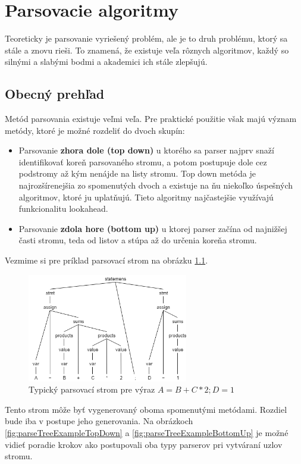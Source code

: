 \chapter{Parsovacie algoritmy}
Teoreticky je parsovanie vyriešený problém, ale je to druh problému, ktorý sa stále a znovu rieši. To znamená, že existuje veľa rôznych algoritmov, každý so silnými a slabými bodmi a akademici ich stále zlepšujú.\cite{tomassetti:parsing}

\section{Obecný prehľad}\label{parsing-alg-basics}
Metód parsovania existuje veľmi veľa. Pre praktické použitie však majú význam metódy, ktoré je možné rozdeliť do dvoch skupín:\cite{CVUT:program_language}
\begin{itemize}
\item Parsovanie \textbf{zhora dole (top down)} u ktorého sa parser najprv snaží identifikovať koreň parsovaného stromu, a potom postupuje dole cez podstromy až kým nenájde na listy stromu. Top down metóda je najrozšírenejšia zo spomenutých dvoch a existuje na ňu niekoľko úspešných algoritmov, ktoré ju uplatňujú. Tieto algoritmy najčastejšie využívajú funkcionalitu lookahead.
\item Parsovanie \textbf{zdola hore (bottom up)} u ktorej parser začína od najnižšej časti stromu, teda od listov a stúpa až do určenia koreňa stromu. 
\end{itemize}

Vezmime si pre príklad parsovací strom na obrázku \ref{fig:parseTreeExample}. 
\begin{figure}[H]
\begin{center}
\includegraphics[width=7cm]{figures/parseTreeExample.png}
\caption{Typický parsovací strom pre výraz $A = B + C*2;  D = 1$}
\label{fig:parseTreeExample}
\end{center}
\end{figure}

Tento strom môže byť vygenerovaný oboma spomenutými metódami. Rozdiel bude iba v postupe jeho generovania. Na obrázkoch \ref{fig:parseTreeExampleTopDown} a \ref{fig:parseTreeExampleBottomUp} je možné vidieť poradie krokov ako postupovali oba typy parserov pri vytváraní uzlov stromu.

